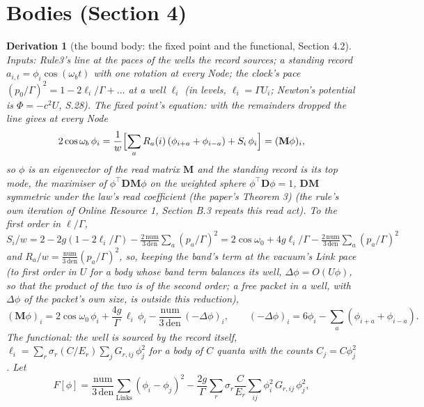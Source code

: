 \documentclass[pdflatex,sn-mathphys-num]{sn-jnl}
\newcommand{\num}{\mathrm{num}}
\newcommand{\den}{\mathrm{den}}
\theoremstyle{thmstyleone}
\newtheorem{derivation}{Derivation}
\begin{document}
\section*{Bodies (Section 4)}

\begin{derivation}[the bound body: the fixed point and the functional, Section 4.2]
\emph{Inputs:} Rule3's line at the paces of the wells the record sources; a standing record $a_{i, t} = \phi_i\cos(\omega_b t)$ with one rotation at every Node; the clock's pace $(p_0 / \Gamma)^2 = 1 - 2\ell_i / \Gamma + \dots$ at a well $\ell_i$ (in levels, $\ell_i = \Gamma U_i$; Newton's potential is $\Phi = -c^2 U$, S.28). \emph{The fixed point's equation:} with the remainders dropped the line gives at every Node
\[
2\cos\omega_b\,\phi_i = \frac{1}{w}\Bigl[\sum_a R_a(i)\,(\phi_{i+a} + \phi_{i-a}) + S_i\,\phi_i\Bigr] = (\mathbf M\phi)_i,
\]
so $\phi$ is an eigenvector of the read matrix $\mathbf M$ and the standing record is its top mode, the maximiser of $\phi^\top\mathbf D\mathbf M\phi$ on the weighted sphere $\phi^\top\mathbf D\phi = 1$, $\mathbf D\mathbf M$ symmetric under the law's read coefficient (the paper's Theorem 3) (the rule's own iteration of Online Resource 1, Section B.3 repeats this read act). To the first order in $\ell / \Gamma$, $S_i / w = 2 - 2g(1 - 2\ell_i / \Gamma) - \frac{2\,\num}{3\,\den}\sum_a (p_a / \Gamma)^2 = 2\cos\omega_0 + 4g\ell_i / \Gamma - \frac{2\,\num}{3\,\den}\sum_a(p_a / \Gamma)^2$ and $R_a / w = \frac{\num}{3\,\den}(p_a / \Gamma)^2$, so, keeping the band's term at the vacuum's Link pace (to first order in $U$ for a body whose band term balances its well, $\Delta\phi = O(U\phi)$, so that the product of the two is of the second order; a free packet in a well, with $\Delta\phi$ of the packet's own size, is outside this reduction),
\[
(\mathbf M\phi)_i = 2\cos\omega_0\,\phi_i + \frac{4g}{\Gamma}\,\ell_i\,\phi_i - \frac{\num}{3\,\den}\,(-\Delta\phi)_i, \qquad (-\Delta\phi)_i = 6\phi_i - \sum_a(\phi_{i+a} + \phi_{i-a}).
\]
\emph{The functional:} the well is sourced by the record itself, $\ell_i = \sum_r \sigma_r (C / E_r)\sum_j G_{r, ij}\,\phi_j^2$ for a body of $C$ quanta with the counts $C_j = C\phi_j^2$. Let
\[
F[\phi] = \frac{\num}{3\,\den}\sum_{\text{Links}}(\phi_i - \phi_j)^2 - \frac{2g}{\Gamma}\sum_r \sigma_r\frac{C}{E_r}\sum_{ij}\phi_i^2\,G_{r, ij}\,\phi_j^2,
\]

\end{derivation}
\end{document}
